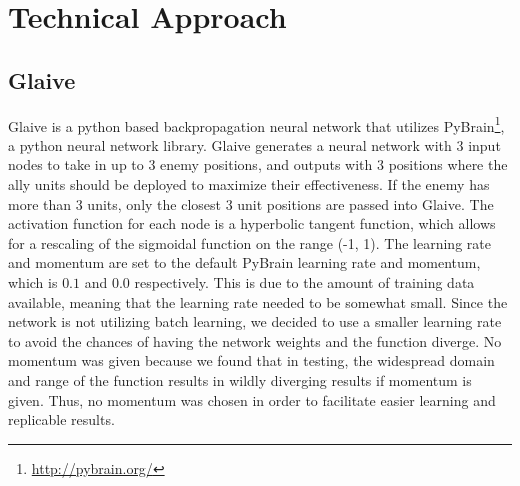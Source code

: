\documentclass[twocolumn]{article}
\begin{document}
\section{Technical Approach}
\subsection{Glaive}
Glaive is a python based backpropagation neural network that utilizes PyBrain\footnote{\tiny{\url{http://pybrain.org/}}}, a python neural network library. 
Glaive generates a neural network with 3 input nodes to take in up to 3 enemy positions, and outputs with 3 positions where the ally units should be deployed to maximize their effectiveness. If the enemy has more than 3 units, only the closest 3 unit positions are passed into Glaive. The activation function for each node is a hyperbolic tangent function, which allows for a rescaling of the sigmoidal function on the range (-1, 1). The learning rate and momentum are set to the default PyBrain learning rate and momentum, which is $0.1$ and $0.0$ respectively. This is due to the amount of training data available, meaning that the learning rate needed to be somewhat small. Since the network is not utilizing batch learning, we decided to use a smaller learning rate to avoid the chances of having the network weights and the function diverge. No momentum was given because we found that in testing, the widespread domain and range of the function results in wildly diverging results if momentum is given. Thus, no momentum was chosen in order to facilitate easier learning and replicable results. 
\end{document}
